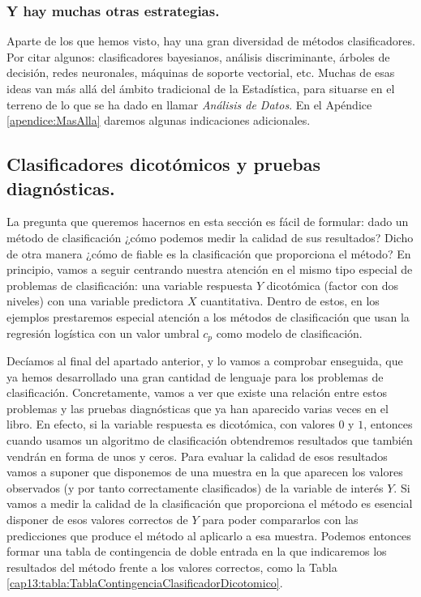 \subsubsection*{Y hay muchas otras  estrategias.}

Aparte de los que hemos visto, hay una gran diversidad de métodos clasificadores. Por citar algunos: clasificadores bayesianos, análisis discriminante, árboles de decisión, redes neuronales, máquinas de soporte vectorial, etc. Muchas de esas ideas van más allá del ámbito tradicional de la Estadística, para situarse en el terreno de lo que se ha dado en llamar {\em Análisis de Datos}. En el Apéndice \ref{apendice:MasAlla} daremos algunas indicaciones adicionales.


\subsection{Clasificadores dicotómicos y pruebas diagnósticas.}
\label{cap13:subsec:ClasificadoresDicotomicosPruebasDiagnosticas}

La pregunta que queremos hacernos en esta sección es fácil de formular: dado un método de clasificación ¿cómo podemos medir la calidad de sus resultados? Dicho de otra manera ¿cómo de fiable es la clasificación que proporciona el método? En principio, vamos a seguir centrando nuestra atención en el mismo tipo especial de problemas de clasificación: una variable respuesta $Y$ dicotómica (factor con dos niveles) con una variable predictora $X$ cuantitativa. Dentro de estos, en los ejemplos prestaremos especial atención  a los métodos de clasificación  que usan la regresión logística con un valor umbral $c_p$ como modelo de clasificación.

Decíamos al final del apartado anterior, y lo vamos a comprobar enseguida, que ya hemos desarrollado una gran cantidad de lenguaje para los problemas de clasificación. Concretamente, vamos a ver que existe una relación entre estos problemas y las pruebas diagnósticas que ya han aparecido varias veces en el libro. En efecto, si la variable respuesta es dicotómica, con valores $0$ y $1$, entonces cuando usamos un algoritmo de clasificación obtendremos resultados que también vendrán en forma de unos y ceros. Para evaluar la calidad de esos resultados vamos a suponer que disponemos de una muestra en la que aparecen los valores observados (y por tanto correctamente clasificados) de la variable de interés $Y$. Si vamos a medir la calidad de la clasificación que proporciona el método es esencial disponer de esos valores correctos de $Y$ para poder compararlos con las predicciones que produce el método al aplicarlo a esa muestra.  Podemos entonces formar una tabla de contingencia de doble entrada en la que indicaremos los resultados del método frente a los valores correctos, como la Tabla \ref{cap13:tabla:TablaContingenciaClasificadorDicotomico}.

